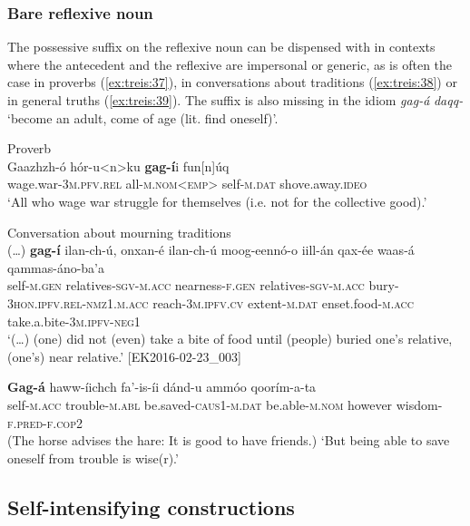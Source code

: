\documentclass[output=paper]{langscibook}
\begin{document}
\subsubsection{Bare reflexive noun}\label{sec:treis:3.2.5}

The possessive suffix on the reflexive noun can be dispensed with in contexts where the antecedent and the reflexive are impersonal or generic, as is often the case in proverbs (\ref{ex:treis:37}), in conversations about traditions (\ref{ex:treis:38}) or in general truths (\ref{ex:treis:39}). The suffix is also missing in the idiom \textit{gag-á} \textit{daqq-} ‘become an adult, come of age (lit. find oneself)’.

\ea\label{ex:treis:36}  Proverb\\
\gll Gaazhzh-ó hór-u<n>ku \textbf{gag-í}i fun[n]úq\\
     wage.war-\textsc{3m.pfv.rel} all-\textsc{m.nom<emp>} self-\textsc{m.dat} shove.away.\textsc{ideo}\\
\glt ‘All who wage war struggle for themselves (i.e. not for the collective good).’ \citep[51]{AlamuAlamaayo2017}\z

\ea\label{ex:treis:37} Conversation about mourning traditions\\
\gll (…) \textbf{gag-í} ilan-ch-ú, onxan-é ilan-ch-ú moog-eennó-o iill-án qax-ée waas-á qammas-áno-ba’a\\
     {} self-\textsc{m.gen} relatives-\textsc{sgv-m.acc} nearness-\textsc{f.gen} relatives-\textsc{sgv-m.acc} bury-\textsc{3hon.ipfv.rel-nmz1.m.acc} reach-\textsc{3m.ipfv.cv} extent-\textsc{m.dat} enset.food-\textsc{m.acc} take.a.bite-\textsc{3m.ipfv-neg1}\\
\glt ‘(…) (one) did not (even) take a bite of food until (people) buried one’s relative, (one’s) near relative.’ [EK2016-02-23\_003]\z

\ea\label{ex:treis:38} 
\gll \textbf{Gag-á} haww-íichch fa’-is-íi dánd-u ammóo qoorím-a-ta\\
     self-\textsc{m.acc} trouble-\textsc{m.abl} be.saved-\textsc{caus1-m.dat} be.able-\textsc{m.nom} however wisdom-\textsc{f.pred-f.cop2}\\
\glt (The horse advises the hare: It is good to have friends.) ‘But being able to save oneself from trouble is wise(r).’ \citep[3.118f]{KEB1989}\z

\subsection{Self-intensifying constructions}\label{sec:treis:3.3}
\end{document}
